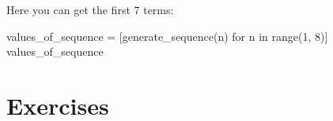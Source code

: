 Here you can get the first 7 terms:




\begin{pyin}
values_of_sequence = [generate_sequence(n) for n in range(1, 8)]
values_of_sequence
\end{pyin}





\begin{raw}
[1, 2, 4, 8, 16, 32, 64]
\end{raw}







\section{Exercises}
\label{\detokenize{tools-for-mathematics/07-sequences/exercises/main:exercises}}\label{\detokenize{tools-for-mathematics/07-sequences/exercises/main::doc}}

